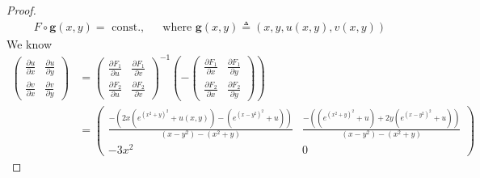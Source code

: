 \documentclass{report}
\begin{document}
\begin{proof}
\begin{align*}
F\circ \textbf{g}(x,y)=\text{ const., }\quad \text{ where } \textbf{g}(x,y)\triangleq (x,y, u(x,y),v(x,y))
\end{align*}
We know 
\begin{align*}
\begin{pmatrix} 
  \frac{\partial u}{\partial x} & \frac{\partial u}{\partial y} \\
  \frac{\partial v}{\partial x} & \frac{\partial v}{\partial y}
\end{pmatrix} &= \begin{pmatrix} 
  \frac{\partial F_1}{\partial u} & \frac{\partial F_1}{\partial v} \\
  \frac{\partial F_2}{\partial u} & \frac{\partial F_2}{\partial v} 
\end{pmatrix}^{-1} \left( - \begin{pmatrix} 
  \frac{\partial F_1}{\partial x}& \frac{\partial F_1}{\partial y} \\
  \frac{\partial F_2}{\partial x}& \frac{\partial F_2}{\partial y}
\end{pmatrix} \right) \\
&= \begin{pmatrix} 
  \frac{-\left( 2x \left(e^{(x^2+y)^2} +u(x,y) \right) - \left(e^{(x-y^2)^2}+ u \right) \right)}{(x-y^2)-(x^2+y)} & \frac{- \left(\left(e^{(x^2+y)^2}+u \right) + 2y \left(e^{(x-y^2)^2}+u \right) \right)}{(x-y^2)-(x^2+y)} \\
  -3x^2 & 0
\end{pmatrix}
\end{align*}

\end{proof}
\end{document}

